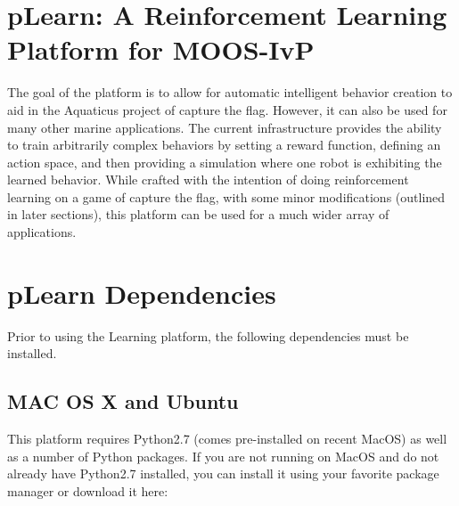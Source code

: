\documentclass[onecolumn,letterpaper,11pt]{article}
\begin{document}
\begin{labcover}
\vspace{0.1in}
\vspace{0.1in}
\end{labcover}


\section{pLearn: A Reinforcement Learning Platform for MOOS-IvP}
\label{reinforcment}

The goal of the  platform is to allow for automatic intelligent behavior creation to aid in the Aquaticus project of capture the flag. However, it can also be used for many other marine applications. The current infrastructure provides the ability to train arbitrarily complex behaviors by setting a reward function, defining an action space, and then providing a simulation where one robot is exhibiting
the learned behavior. While crafted with the intention of doing reinforcement learning on a game of capture the flag, with some minor modifications (outlined in later sections), this platform can be used for a much wider array of applications.

\section{pLearn Dependencies}

Prior to using the  Learning platform, the following dependencies must be installed.

\subsection{MAC OS X and Ubuntu}

This platform requires Python2.7 (comes pre-installed on recent MacOS) as well
as a number of Python packages. If you are not running on MacOS and do not
already have Python2.7 installed, you can install it using your favorite package manager or download it here:
\end{document}
